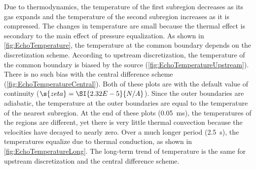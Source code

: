 Due to thermodynamics, the temperature of the first subregion decreases as its gas expands and the temperature of the second subregion increases as it is compressed.  The changes in temperature are small because the thermal effect is secondary to the main effect of pressure equalization.  As shown in \autoref{fig:EchoTemperature}, the temperature at the common boundary depends on the discretization scheme.  According to upstream discretization, the temperature of the common boundary is biased by the source (\autoref{fig:EchoTemperatureUpstream}).  There is no such bias with the central difference scheme (\autoref{fig:EchoTemperatureCentral}).  Both of these plots are with the default value of continuity ($\s{zeta} = \SI{2.32E-5}{N/A}$).  Since the outer boundaries are adiabatic, the temperature at the outer boundaries are equal to the temperature of the nearest subregion.  At the end of these plots (\SI{0.05}{ms}), the temperatures of the regions are different, yet there is very little thermal convection because the velocities have decayed to nearly zero.  Over a much longer period (\SI{2.5}{s}), the temperatures equalize due to thermal conduction, as shown in \autoref{fig:EchoTemperatureLong}.  The long-term trend of temperature is the same for upstream discretization and the central difference scheme.

